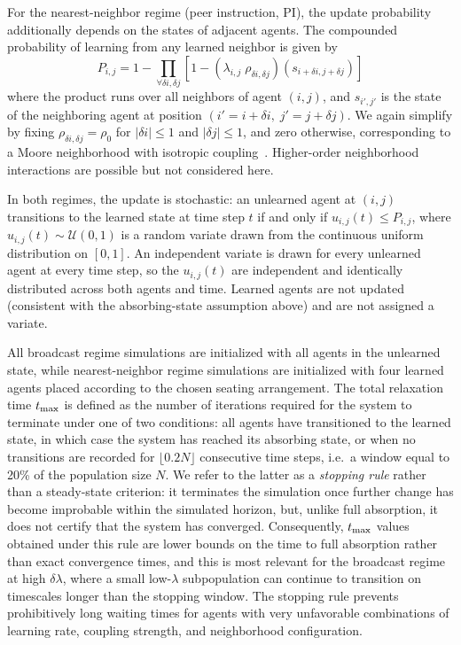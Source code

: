 \documentclass[a4paper,fleqn]{cas-sc}
\begin{document}
For the nearest-neighbor regime (peer instruction, PI), the update probability additionally depends on the states of adjacent agents.
The compounded probability of learning from any learned neighbor is given by
\begin{equation}
\label{eq:BPCA PI learning probability}
    P_{i,j} = 1 - \prod_{\forall \delta i, \delta j}{\left[1-(\lambda_{i,j}\;\rho_{\delta i, \delta j})(s_{i+\delta i, j+\delta j})\right]}
\end{equation}
where the product runs over all neighbors of agent $(i,j)$, and $s_{i',j'}$ is the state of the neighboring agent at position $(i'=i+\delta i,\; j'=j+\delta j)$.
We again simplify by fixing $\rho_{\delta i,\delta j}=\rho_0$ for $|\delta i|\leq1$ and $|\delta j|\leq1$, and zero otherwise, corresponding to a Moore neighborhood with isotropic coupling~\citep{kari2005catheory, zaitsev2017generalized, louis2018probabilistic}.
Higher-order neighborhood interactions are possible but not considered here.

In both regimes, the update is stochastic: an unlearned agent at $(i,j)$ transitions to the learned state at time step $t$ if and only if $u_{i,j}(t)\leq P_{i,j}$, where $u_{i,j}(t)\sim\mathcal{U}(0,1)$ is a random variate drawn from the continuous uniform distribution on $[0,1]$. An independent variate is drawn for every unlearned agent at every time step, so the $u_{i,j}(t)$ are independent and identically distributed across both agents and time. Learned agents are not updated (consistent with the absorbing-state assumption above) and are not assigned a variate.

All broadcast regime simulations are initialized with all agents in the unlearned state, while nearest-neighbor regime simulations are initialized with four learned agents placed according to the chosen seating arrangement.
The total relaxation time $t_{\rm max}$ is defined as the number of iterations required for the system to terminate under one of two conditions: all agents have transitioned to the learned state, in which case the system has reached its absorbing state, or when no transitions are recorded for $\lfloor 0.2N\rfloor$ consecutive time steps, i.e.\ a window equal to 20\% of the population size $N$.
We refer to the latter as a \textit{stopping rule} rather than a steady-state criterion: it terminates the simulation once further change has become improbable within the simulated horizon, but, unlike full absorption, it does not certify that the system has converged. Consequently, $t_{\rm max}$ values obtained under this rule are lower bounds on the time to full absorption rather than exact convergence times, and this is most relevant for the broadcast regime at high $\delta\lambda$, where a small low-$\lambda$ subpopulation can continue to transition on timescales longer than the stopping window.
The stopping rule prevents prohibitively long waiting times for agents with very unfavorable combinations of learning rate, coupling strength, and neighborhood configuration.
\end{document}
